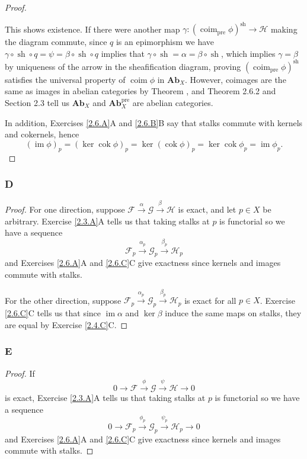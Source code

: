 \documentclass{article}
\newcommand{\fF}{\mathscr{F}}
\newcommand{\fG}{\mathscr{G}}
\newcommand{\fH}{\mathscr{H}}
\DeclareMathOperator{\pre}{pre}
\DeclareMathOperator{\im}{im}
\DeclareMathOperator{\coim}{coim}
\DeclareMathOperator{\cok}{cok}
\DeclareMathOperator{\sh}{sh}
\newcommand{\Ab}{\mathbf{Ab}} %
\begin{document}
\begin{proof}
\begin{center}
    \end{center}
    This shows existence. If there were another map $\gamma:(\coim_{\pre} \phi)^{\sh} \to \fH$ making the diagram commute, since $q$ is an epimorphism we have $\gamma \circ \sh \circ q = \psi = \beta \circ \sh \circ q$ implies that $\gamma \circ \sh =\alpha= \beta \circ \sh$, which implies $\gamma = \beta$ by uniqueness of the arrow in the sheafification diagram, proving $(\coim_{\pre} \phi)^{\sh}$ satisfies the universal property of $\coim \phi$ in $\Ab_X$. However, coimages are the same as images in abelian categories by Theorem %
    , and Theorem 2.6.2 and Section 2.3 tell us $\Ab_X$ and $\Ab_X^{\text{pre}}$ are abelian categories.

    In addition, Exercises \ref{2.6.A}A and \ref{2.6.B}B say that stalks commute with kernels and cokernels, hence
    \[
    (\im \phi)_p = (\ker \cok \phi)_p = \ker (\cok \phi)_p = \ker \cok \phi_p= \im \phi_p.
    \]
\end{proof}
\subsubsection{D} \label{2.6.D}
\begin{proof}
    For one direction, suppose $\fF \xrightarrow{\alpha} \fG \xrightarrow{\beta} \fH$ is exact, and let $p\in X$ be arbitrary. Exercise \ref{2.3.A}A tells us that taking stalks at $p$ is functorial so we have a sequence
    \[
    \fF_p \xrightarrow{\alpha_p} \fG_p \xrightarrow{\beta_p} \fH_p
    \]
    and Exercises \ref{2.6.A}A and \ref{2.6.C}C give exactness since kernels and images commute with stalks.
    
    For the other direction, suppose $\fF_p \xrightarrow{\alpha_p} \fG_p \xrightarrow{\beta_p} \fH_p$ is exact for all $p\in X$. Exercise \ref{2.6.C}C tells us that since $\im \alpha$ and $\ker \beta$ induce the same maps on stalks, they are equal by Exercise \ref{2.4.C}C.
\end{proof}
\subsubsection{E}\label{2.6.E}
\begin{proof}
    If 
    \[
    0\to \fF \xrightarrow{\phi} \fG \xrightarrow{\psi} \fH \to 0
    \]
    is exact, Exercise \ref{2.3.A}A tells us that taking stalks at $p$ is functorial so we have a sequence
    \[
    0\to \fF_p \xrightarrow{\phi_p} \fG_p \xrightarrow{\psi_p} \fH_p \to 0
    \]
    and Exercises \ref{2.6.A}A and \ref{2.6.C}C give exactness since kernels and images commute with stalks.
\end{proof}
\end{document}
